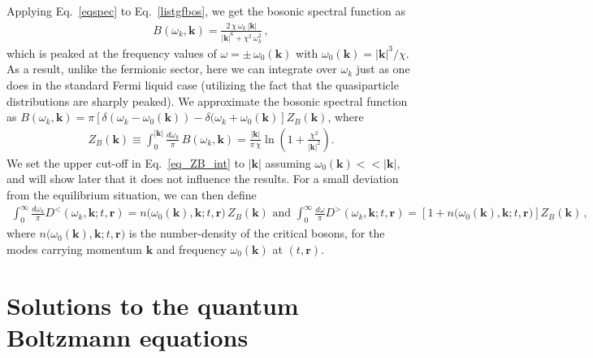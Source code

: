 \documentclass[aps, prb, onecolumn, nofootinbib, citeautoscript, 10pt]{revtex4-2}
\newcommand{\bk}{\mathbf{k}}
\newcommand{\br}{\mathbf{r}}
\begin{document}
Applying Eq.~\eqref{eqspec} to Eq.~\eqref{listgfbos}, we get the bosonic spectral function as
\begin{align}
B(\omega_k, \bk ) = 
\frac{2 \,\chi \, \omega_k \, |\bk|} {|\bk|^6  +  \chi^2 \, \omega_k^2} \,,
\label{eqbosspec}
\end{align}
which is peaked at the frequency values of $\omega= \pm \,\omega_0 (\bk) $ with $ \omega_0 (\bk) = |\bk|^3 / \chi$. As a result, unlike the fermionic sector, here we can integrate over $\omega_k $ just as one does in the standard Fermi liquid case (utilizing the fact that the quasiparticle distributions are sharply peaked). We approximate the bosonic spectral function as $B(\omega_k, \bk ) = \pi \left[\delta(\omega_k-\omega_0(\bk))-\delta(\omega_k  +  \omega_0(\bk)\right]
Z_B(\bk)$, where 
\begin{align}
	Z_B(\bk) \equiv   
	\int_0^{|\bk|} \frac{d\omega_k}{\pi} \, B(\omega_k, \bk ) = \frac{|\bk|}{\pi \,\chi}
	\ln \left(1  +  \frac{\chi^2}{|\bk|^2}\right)  .
	\label{eq_ZB_int}
\end{align}
We set the upper cut-off in Eq.~\eqref{eq_ZB_int} to $|\bk|$ assuming $\omega_0(\bk) << |\bk|$, and will show later that it does not influence the results. For a small deviation from the equilibrium situation, we can then define
\begin{align}
	\int_0^\infty \frac{d\omega_k} {\pi} D^<(\omega_k , \bk ;t, \br ) = 
	n \big ( \omega_0(\bk), \bk;t, \br \big ) \,Z_B(\bk) \text{ and }
	\int_0^\infty \frac{d\omega}{\pi} D^>(\omega_k, \bk ;t, \br ) = 
	\left [ 1 + n  \big (\omega_0(\bk),\bk;t, \br \big ) \right ] Z_B(\bk) \,,
	\label{eq-bos-dist}
\end{align}
where $  n \big (\omega_0(\bk), \bk ;t, \br \big ) $ is the number-density of the critical bosons, for the modes carrying momentum $\bk$ and frequency $\omega_0(\bk) $ at $(t, \br)$.



\section{Solutions to the quantum Boltzmann equations}
\label{secqbe}
\end{document}

